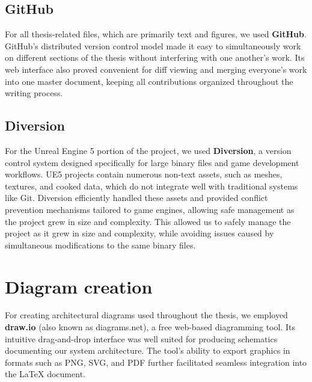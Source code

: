 \subsection{GitHub}

For all thesis-related files, which are primarily text and figures, we used \textbf{GitHub}. GitHub's distributed version control model made it easy to simultaneously work on different sections of the thesis without interfering with one another's work. Its web interface also proved convenient for diff viewing and merging everyone's work into one master document, keeping all contributions organized throughout the writing process.

\subsection{Diversion}

For the Unreal Engine 5 portion of the project, we used \textbf{Diversion}, a version control system designed specifically for large binary files and game development workflows. UE5 projects contain numerous non-text assets, such as meshes, textures, and cooked data, which do not integrate well with traditional systems like Git. Diversion efficiently handled these assets and provided conflict prevention mechanisms tailored to game engines, allowing safe management as the project grew in size and complexity. This allowed us to safely manage the project as it grew in size and complexity, while avoiding issues caused by simultaneous modifications to the same binary files.

\section{Diagram creation}

For creating architectural diagrams used throughout the thesis, we employed \textbf{draw.io} (also known as diagrams.net), a free web-based diagramming tool. Its intuitive drag-and-drop interface was well suited for producing schematics documenting our system architecture. The tool's ability to export graphics in formats such as PNG, SVG, and PDF further facilitated seamless integration into the LaTeX document.